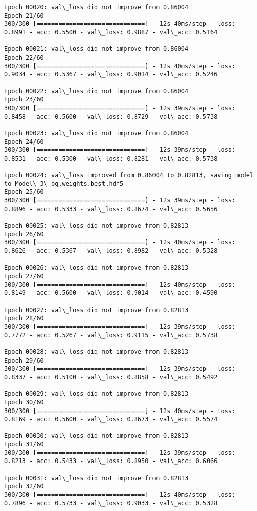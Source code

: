 \documentclass[11pt]{article}
\begin{document}
\begin{Verbatim}[commandchars=\\\{\}]
Epoch 00020: val\_loss did not improve from 0.86004
Epoch 21/60
300/300 [==============================] - 12s 40ms/step - loss: 0.8991 - acc: 0.5500 - val\_loss: 0.9887 - val\_acc: 0.5164

Epoch 00021: val\_loss did not improve from 0.86004
Epoch 22/60
300/300 [==============================] - 12s 40ms/step - loss: 0.9034 - acc: 0.5367 - val\_loss: 0.9014 - val\_acc: 0.5246

Epoch 00022: val\_loss did not improve from 0.86004
Epoch 23/60
300/300 [==============================] - 12s 39ms/step - loss: 0.8458 - acc: 0.5600 - val\_loss: 0.8729 - val\_acc: 0.5738

Epoch 00023: val\_loss did not improve from 0.86004
Epoch 24/60
300/300 [==============================] - 12s 39ms/step - loss: 0.8531 - acc: 0.5300 - val\_loss: 0.8281 - val\_acc: 0.5738

Epoch 00024: val\_loss improved from 0.86004 to 0.82813, saving model to Model\_3\_bg.weights.best.hdf5
Epoch 25/60
300/300 [==============================] - 12s 39ms/step - loss: 0.8896 - acc: 0.5333 - val\_loss: 0.8674 - val\_acc: 0.5656

Epoch 00025: val\_loss did not improve from 0.82813
Epoch 26/60
300/300 [==============================] - 12s 40ms/step - loss: 0.8626 - acc: 0.5367 - val\_loss: 0.8982 - val\_acc: 0.5328

Epoch 00026: val\_loss did not improve from 0.82813
Epoch 27/60
300/300 [==============================] - 12s 40ms/step - loss: 0.8149 - acc: 0.5600 - val\_loss: 0.9014 - val\_acc: 0.4590

Epoch 00027: val\_loss did not improve from 0.82813
Epoch 28/60
300/300 [==============================] - 12s 39ms/step - loss: 0.7772 - acc: 0.5267 - val\_loss: 0.9115 - val\_acc: 0.5738

Epoch 00028: val\_loss did not improve from 0.82813
Epoch 29/60
300/300 [==============================] - 12s 39ms/step - loss: 0.8337 - acc: 0.5100 - val\_loss: 0.8858 - val\_acc: 0.5492

Epoch 00029: val\_loss did not improve from 0.82813
Epoch 30/60
300/300 [==============================] - 12s 40ms/step - loss: 0.8169 - acc: 0.5600 - val\_loss: 0.8673 - val\_acc: 0.5574

Epoch 00030: val\_loss did not improve from 0.82813
Epoch 31/60
300/300 [==============================] - 12s 39ms/step - loss: 0.8213 - acc: 0.5433 - val\_loss: 0.8950 - val\_acc: 0.6066

Epoch 00031: val\_loss did not improve from 0.82813
Epoch 32/60
300/300 [==============================] - 12s 40ms/step - loss: 0.7896 - acc: 0.5733 - val\_loss: 0.9033 - val\_acc: 0.5328


\end{Verbatim}
\end{document}
